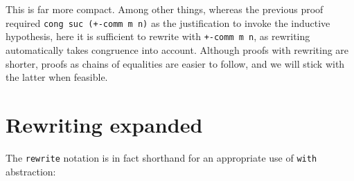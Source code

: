 \begin{fence}
\begin{code}%
\>[0]\AgdaSpace{}%
\AgdaSymbol{:}\AgdaSpace{}%
\AgdaSpace{}%
\AgdaSymbol{(}\AgdaSpace{}%
\AgdaSpace{}%
\AgdaSymbol{:}\AgdaSpace{}%
\AgdaSymbol{)}\AgdaSpace{}%
\AgdaSpace{}%
\AgdaSpace{}%
\AgdaOperator{\AgdaFunction{+}}\AgdaSpace{}%
\AgdaSpace{}%
\AgdaSpace{}%
\AgdaSpace{}%
\AgdaOperator{\AgdaFunction{+}}\AgdaSpace{}%
\<%
\\
\>[0]\AgdaSpace{}%
%
\>[16]%
\>[19]\AgdaSpace{}%
\AgdaSpace{}%
%
\>[52]\AgdaSymbol{=}%
\>[55]\<%
\\
\>[0]\AgdaSpace{}%
\AgdaSymbol{(}\AgdaSpace{}%
\AgdaSymbol{)}\AgdaSpace{}%
%
\>[19]\AgdaSpace{}%
\AgdaSpace{}%
\AgdaSpace{}%
\AgdaSpace{}%
\AgdaSymbol{|}\AgdaSpace{}%
\AgdaSpace{}%
\AgdaSpace{}%
%
\>[52]\AgdaSymbol{=}%
\>[55]\<%
\end{code}
\end{fence}

This is far more compact. Among other things, whereas the previous proof
required \texttt{cong\ suc\ (+-comm\ m\ n)} as the justification to
invoke the inductive hypothesis, here it is sufficient to rewrite with
\texttt{+-comm\ m\ n}, as rewriting automatically takes congruence into
account. Although proofs with rewriting are shorter, proofs as chains of
equalities are easier to follow, and we will stick with the latter when
feasible.

\hypertarget{rewriting-expanded}{%
\section{Rewriting expanded}\label{rewriting-expanded}}

The \texttt{rewrite} notation is in fact shorthand for an appropriate
use of \texttt{with} abstraction:

